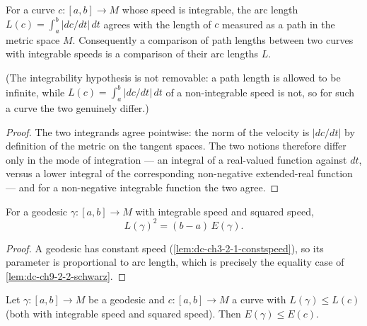 \begin{lemma}
  \label{lem:dc-ch9-2-3-arclength-bridge}


  For a curve $c:[a,b]\to M$ whose speed is integrable, the arc length
  $L(c)=\int_a^b|dc/dt|\,dt$ agrees with the length of $c$
  measured as a path in the metric space $M$. Consequently a comparison of path lengths
  between two curves with integrable speeds is a comparison of their arc lengths $L$.

  (The integrability hypothesis is not removable: a path length is allowed to be infinite,
  while $L(c)=\int_a^b|dc/dt|\,dt$ of a non-integrable speed is not, so for such a curve the
  two genuinely differ.)
\end{lemma}
\begin{proof}

  \sketch
  The two integrands agree pointwise: the norm of the velocity is $|dc/dt|$ by definition of
  the metric on the tangent spaces. The two notions therefore differ only in the mode of
  integration --- an integral of a real-valued function against $dt$, versus a lower integral
  of the corresponding non-negative extended-real function --- and for a non-negative
  integrable function the two agree.
\end{proof}
\begin{lemma}
  \label{lem:dc-ch9-2-3-geodesic-equality}


  For a geodesic $\gamma:[a,b]\to M$ with integrable speed and squared speed,
  $$
  L(\gamma)^2 = (b-a)\,E(\gamma).
  $$
\end{lemma}
\begin{proof}

  \sketch
  A geodesic has constant speed (\cref{lem:dc-ch3-2-1-constspeed}), so its parameter is
  proportional to arc length, which is precisely the equality case of
  \cref{lem:dc-ch9-2-2-schwarz}.

\end{proof}
\begin{lemma}
  \label{lem:dc-ch9-2-3-inequality}


  Let $\gamma:[a,b]\to M$ be a geodesic and $c:[a,b]\to M$ a curve with $L(\gamma)\le L(c)$
  (both with integrable speed and squared speed). Then $E(\gamma)\le E(c)$.

\end{lemma}
